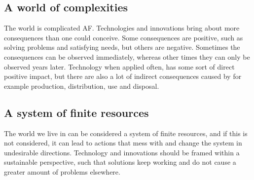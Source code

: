 \subsection*{A world of complexities}
The world is complicated AF. Technologies and innovations bring about more consequences than one could conceive.
Some consequences are positive, such as solving problems and satisfying needs, but others are negative.
Sometimes the consequences can be observed immediately, whereas other times they can only be observed years later.
Technology when applied often, has some sort of direct positive impact, but there are also a lot of indirect consequences caused by for example production, distribution, use and disposal.


\subsection*{A system of finite resources}
The world we live in can be considered a system of finite resources, and if this is not considered, it can lead to actions that mess with and change the system in undesirable directions.
Technology and innovations should be framed within a sustainable perspective, such that solutions keep working and do not cause a greater amount of problems elsewhere. 
